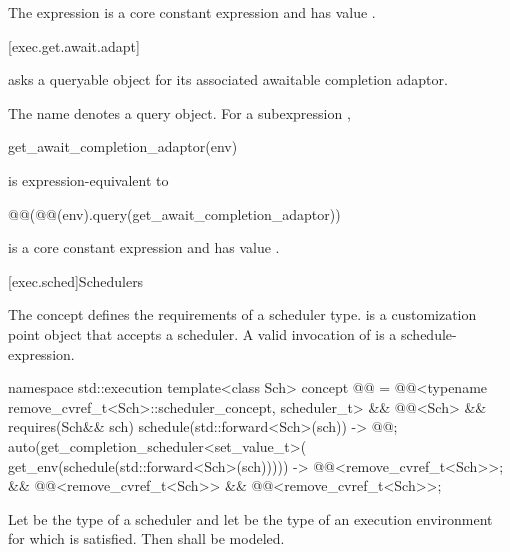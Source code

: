 \pnum
The expression
is a core constant expression and has value .

[exec.get.await.adapt]{}

\pnum
{} asks a queryable object for
its associated awaitable completion adaptor.

\pnum
The name  denotes a query object.
For a subexpression ,
\begin{codeblock}
get_await_completion_adaptor(env)
\end{codeblock}
is expression-equivalent to
\begin{codeblock}
@@(@@(env).query(get_await_completion_adaptor))
\end{codeblock}

\pnum
{}
is a core constant expression and has value .

[exec.sched]{Schedulers}

\pnum
The  concept defines
the requirements of a scheduler type.
 is a customization point object
that accepts a scheduler.
A valid invocation of  is a schedule-expression.
\begin{codeblock}
namespace std::execution {
  template<class Sch>
    concept @@ =
      @@<typename remove_cvref_t<Sch>::scheduler_concept, scheduler_t> &&
      @@<Sch> &&
      requires(Sch&& sch) {
        { schedule(std::forward<Sch>(sch)) } -> @@;
        { auto(get_completion_scheduler<set_value_t>(
            get_env(schedule(std::forward<Sch>(sch))))) }
              -> @@<remove_cvref_t<Sch>>;
      } &&
      @@<remove_cvref_t<Sch>> &&
      @@<remove_cvref_t<Sch>>;
}
\end{codeblock}

\pnum
Let  be the type of a scheduler and
let  be the type of an execution environment
for which 
is satisfied.
Then 
shall be modeled.

